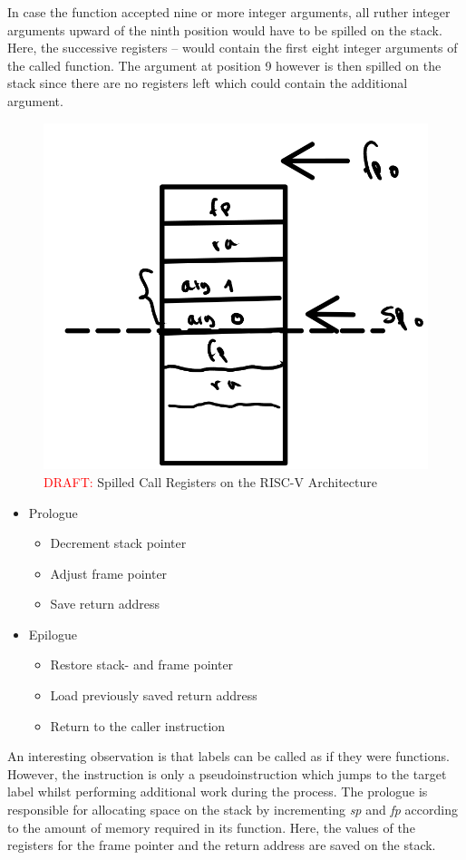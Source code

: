 In case the function accepted nine or more integer arguments,
all ruther integer arguments upward of the ninth position would have to be spilled on the stack.
Here, the successive registers -- would contain the first eight integer arguments of the called function.
The argument at position 9 however is then spilled on the stack since there are no registers left which could contain the additional argument.

\begin{figure}[h]
	\includegraphics[width=.3\textwidth]{./riscv_call_stack_draft.png}
	\caption{\textcolor{red}{DRAFT:} Spilled Call Registers on the RISC-V Architecture}\label{fig:riscv_stack}
\end{figure}



\begin{itemize}
	\item Prologue
	      \begin{itemize}
		      \item Decrement stack pointer
		      \item Adjust frame pointer
		      \item Save return address
	      \end{itemize}
    \item Epilogue
        \begin{itemize}
            \item Restore stack- and frame pointer
            \item Load previously saved return address
            \item Return to the caller instruction
        \end{itemize}
\end{itemize}

An interesting observation is that labels can be called as if they were functions.
However, the  instruction is only a pseudoinstruction which jumps to the target label whilst performing additional work during the process.
The prologue is responsible for allocating space on the stack by incrementing \emph{sp} and \emph{fp} according to the amount of memory required in its function.
Here, the values of the registers for the frame pointer and the return address are saved on the stack.

